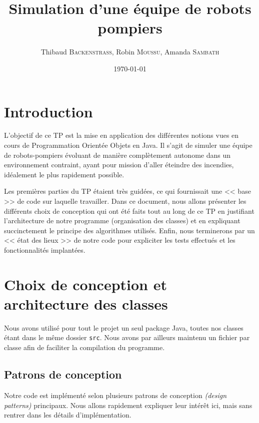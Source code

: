 \documentclass[a4paper,11pt]{article}
\title{Simulation d'une équipe de robots pompiers}
\date{\today}
\author{Thibaud \textsc{Backenstrass}, Robin \textsc{Moussu}, Amanda \textsc{Sambath}}
\begin{document}
\maketitle

\vspace{\baselineskip}
\section*{Introduction}
L'objectif de ce TP est la mise en application des différentes notions vues en cours de Programmation Orientée Objets en Java. Il s'agit de simuler une équipe de robots-pompiers évoluant de manière complètement autonome dans un environnement contraint, ayant pour mission d'aller éteindre des incendies, idéalement le plus rapidement possible.

\vspace{\baselineskip}
Les premières parties du TP étaient très guidées, ce qui fournissait une << base >> de code sur laquelle travailler. Dans ce document, nous allons présenter les différents choix de conception qui ont été faits tout au long de ce TP en justifiant l'architecture de notre programme (organisation des classes) et en expliquant succinctement le principe des algorithmes utilisés. Enfin, nous terminerons par un << état des lieux >> de notre code pour expliciter les tests effectués et les fonctionnalités implantées.


\section{Choix de conception et architecture des classes}

Nous avons utilisé pour tout le projet un seul package Java, toutes nos classes étant dans le même dossier \texttt{src}. Nous avons par ailleurs maintenu un fichier par classe afin de faciliter la compilation du programme.

\subsection{Patrons de conception}
Notre code est implémenté selon plusieurs patrons de conception \emph{(design patterns)} principaux. Nous allons rapidement expliquer leur intérêt ici, mais sans rentrer dans les détails d'implémentation.
\end{document}

